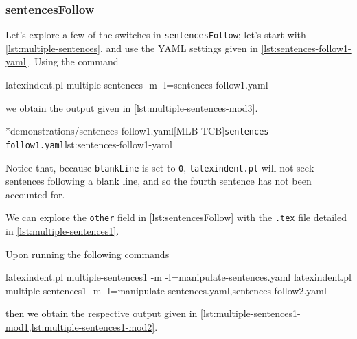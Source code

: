 \subsubsection{sentencesFollow}
	Let's explore a few of the switches in \texttt{sentencesFollow}; let's start with
	\vref{lst:multiple-sentences}, and use the YAML settings given in
	\cref{lst:sentences-follow1-yaml}. Using the command
	\begin{commandshell}
latexindent.pl multiple-sentences -m -l=sentences-follow1.yaml
\end{commandshell}
	we obtain the output given in \cref{lst:multiple-sentences-mod3}.

	\begin{minipage}{.5\linewidth}
	\end{minipage}
	\hfill
	\begin{minipage}{.5\linewidth}
		\cmhlistingsfromfile[style=yaml-LST]*{demonstrations/sentences-follow1.yaml}[MLB-TCB]{\texttt{sentences-follow1.yaml}}{lst:sentences-follow1-yaml}
	\end{minipage}

	Notice that, because \texttt{blankLine} is set to \texttt{0},
	\texttt{latexindent.pl} will not seek sentences following a blank line, and so the
	fourth sentence has not been accounted for.

	We can explore the \texttt{other} field in \cref{lst:sentencesFollow} with
	the \texttt{.tex} file detailed in \cref{lst:multiple-sentences1}.


	Upon running the following commands
	\begin{widepage}
		\begin{commandshell}
latexindent.pl multiple-sentences1 -m -l=manipulate-sentences.yaml
latexindent.pl multiple-sentences1 -m -l=manipulate-sentences.yaml,sentences-follow2.yaml
	\end{commandshell}
	\end{widepage}
	then we obtain the respective output given in \cref{lst:multiple-sentences1-mod1,lst:multiple-sentences1-mod2}.

